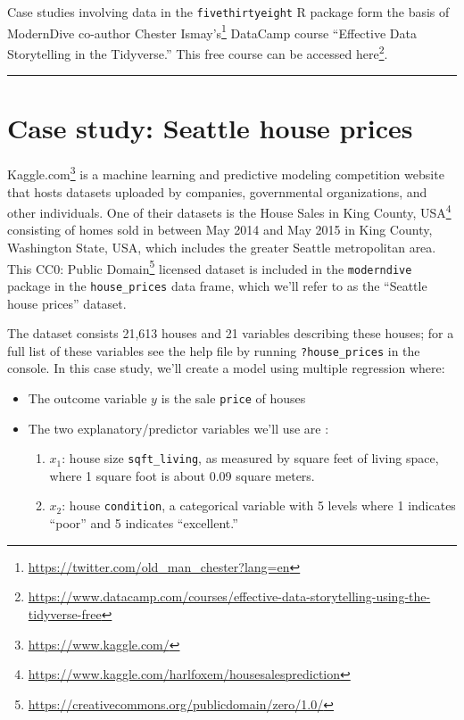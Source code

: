\documentclass[12pt,]{krantz}
\providecommand{\tightlist}{%
  \setlength{\itemsep}{0pt}\setlength{\parskip}{0pt}}
\renewcommand{\href}[2]{#2\footnote{\url{#1}}}
\begin{document}
Case studies involving data in the \texttt{fivethirtyeight} R package
form the basis of ModernDive co-author
\href{https://twitter.com/old_man_chester?lang=en}{Chester Ismay's}
DataCamp course ``Effective Data Storytelling in the Tidyverse.'' This
free course can be accessed
\href{https://www.datacamp.com/courses/effective-data-storytelling-using-the-tidyverse-free}{here}.

\begin{center}\rule{0.5\linewidth}{\linethickness}\end{center}

\section{Case study: Seattle house prices}\label{seattle-house-prices}

\href{https://www.kaggle.com/}{Kaggle.com} is a machine learning and
predictive modeling competition website that hosts datasets uploaded by
companies, governmental organizations, and other individuals. One of
their datasets is the
\href{https://www.kaggle.com/harlfoxem/housesalesprediction}{House Sales
in King County, USA} consisting of homes sold in between May 2014 and
May 2015 in King County, Washington State, USA, which includes the
greater Seattle metropolitan area. This
\href{https://creativecommons.org/publicdomain/zero/1.0/}{CC0: Public
Domain} licensed dataset is included in the \texttt{moderndive} package
in the \texttt{house\_prices} data frame, which we'll refer to as the
``Seattle house prices'' dataset.

The dataset consists 21,613 houses and 21 variables describing these
houses; for a full list of these variables see the help file by running
\texttt{?house\_prices} in the console. In this case study, we'll create
a model using multiple regression where:

\begin{itemize}
\tightlist
\item
  The outcome variable \(y\) is the sale \texttt{price} of houses
\item
  The two explanatory/predictor variables we'll use are :

  \begin{enumerate}
  \def\labelenumi{\arabic{enumi}.}
  \tightlist
  \item
    \(x_1\): house size \texttt{sqft\_living}, as measured by square
    feet of living space, where 1 square foot is about 0.09 square
    meters.
  \item
    \(x_2\): house \texttt{condition}, a categorical variable with 5
    levels where 1 indicates ``poor'' and 5 indicates ``excellent.''
  \end{enumerate}
\end{itemize}
\end{document}
